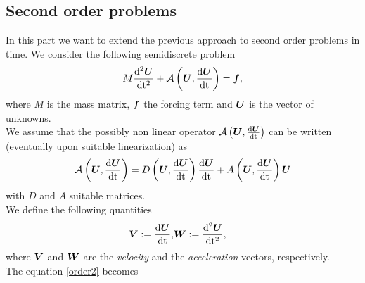 \documentclass[english,a4paper]{article}
\newcommand{\Ubf}{\text{\mbox{\boldmath $U$}}}
\newcommand{\Abf}{\text{\mbox{\boldmath $W$}}}
\newcommand{\fbf}{\text{\mbox{\boldmath $f$}}}
\newcommand{\Wbf}{\text{\mbox{\boldmath $V$}}}
\begin{document}
\subsection{ Second order problems}
In this part we want to extend the previous approach to   second order
problems in
time.
We consider the following semidiscrete problem
\begin{equation}\label{order2}
M\frac{\rm{d}^2\Ubf}{\rm{d} t^2}+\mathcal{A}\left(\Ubf,\frac{\rm{d}\Ubf}{\rm{d} t}\right)=\fbf,
\end{equation}
where $M$ is the mass matrix, $\fbf$ the forcing term
 and $\Ubf$ is the  vector of unknowns.\\
We assume that the possibly non linear operator
$\mathcal{A}\left(\Ubf,\frac{\rm{d}\Ubf}{\rm{d} t}\right)$ can be written
(eventually upon  suitable linearization) as 
$$
\mathcal{A}\left(\Ubf,\frac{\rm{d}\Ubf}{\rm{d} t}\right)=
D\left(\Ubf,\frac{\rm{d}\Ubf}{\rm{d} t}\right)\frac{\rm{d}\Ubf}{\rm{d}
  t}+ A\left(\Ubf,\frac{\rm{d}\Ubf}{\rm{d} t}\right) \Ubf
$$
with $D$ and $A$ suitable  matrices.\\
We define the following quantities
\begin{eqnarray*}
\Wbf:=\frac{\rm{d } \Ubf}{\rm{d } t }, & \displaystyle\Abf:=\frac{\rm{d }^2  \Ubf}{\rm{d } t^2 },
\end{eqnarray*}
where $\Wbf$ and $\Abf$ are the {\sl velocity} and the {\sl acceleration} vectors,
respectively.\\
The equation \eqref{order2} becomes
\end{document}
